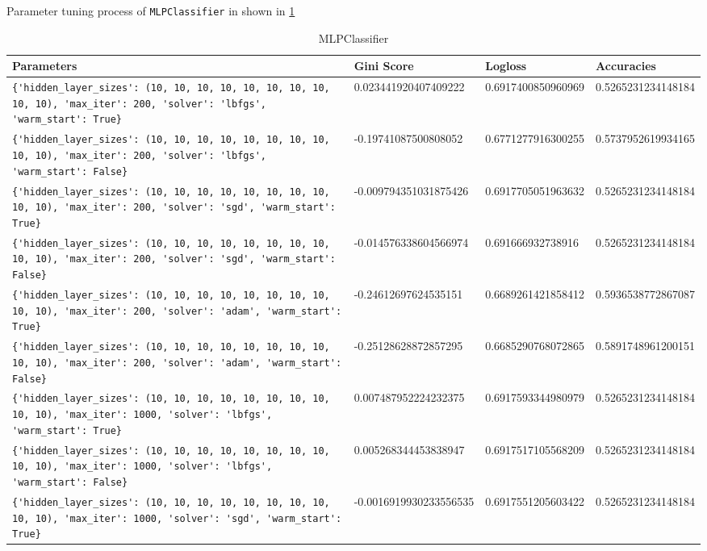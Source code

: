 
Parameter tuning process of \verb|MLPClassifier| in shown in \cref{pt:MLPClassifier} 

\begin{table} \centering
\caption{MLPClassifier} 
\label{pt:MLPClassifier} 
\begin{tabular}{llll}\toprule\bfseries Parameters & \bfseries Gini Score & \bfseries Logloss &\bfseries Accuracies \\\midrule 
\verb|{'hidden_layer_sizes': (10, 10, 10, 10, 10, 10, 10, 10, 10, 10), 'max_iter': 200, 'solver': 'lbfgs', 'warm_start': True}| & 0.023441920407409222 & 0.6917400850960969 & 0.5265231234148184 \\ 
\verb|{'hidden_layer_sizes': (10, 10, 10, 10, 10, 10, 10, 10, 10, 10), 'max_iter': 200, 'solver': 'lbfgs', 'warm_start': False}| & -0.19741087500808052 & 0.6771277916300255 & 0.5737952619934165 \\ 
\verb|{'hidden_layer_sizes': (10, 10, 10, 10, 10, 10, 10, 10, 10, 10), 'max_iter': 200, 'solver': 'sgd', 'warm_start': True}| & -0.009794351031875426 & 0.6917705051963632 & 0.5265231234148184 \\ 
\verb|{'hidden_layer_sizes': (10, 10, 10, 10, 10, 10, 10, 10, 10, 10), 'max_iter': 200, 'solver': 'sgd', 'warm_start': False}| & -0.014576338604566974 & 0.691666932738916 & 0.5265231234148184 \\ 
\verb|{'hidden_layer_sizes': (10, 10, 10, 10, 10, 10, 10, 10, 10, 10), 'max_iter': 200, 'solver': 'adam', 'warm_start': True}| & -0.24612697624535151 & 0.6689261421858412 & 0.5936538772867087 \\ 
\verb|{'hidden_layer_sizes': (10, 10, 10, 10, 10, 10, 10, 10, 10, 10), 'max_iter': 200, 'solver': 'adam', 'warm_start': False}| & -0.25128628872857295 & 0.6685290768072865 & 0.5891748961200151 \\ 
\verb|{'hidden_layer_sizes': (10, 10, 10, 10, 10, 10, 10, 10, 10, 10), 'max_iter': 1000, 'solver': 'lbfgs', 'warm_start': True}| & 0.007487952224232375 & 0.6917593344980979 & 0.5265231234148184 \\ 
\verb|{'hidden_layer_sizes': (10, 10, 10, 10, 10, 10, 10, 10, 10, 10), 'max_iter': 1000, 'solver': 'lbfgs', 'warm_start': False}| & 0.005268344453838947 & 0.6917517105568209 & 0.5265231234148184 \\ 
\verb|{'hidden_layer_sizes': (10, 10, 10, 10, 10, 10, 10, 10, 10, 10), 'max_iter': 1000, 'solver': 'sgd', 'warm_start': True}| & -0.0016919930233556535 & 0.6917551205603422 & 0.5265231234148184 \\ 

\end{tabular}
\end{table}
